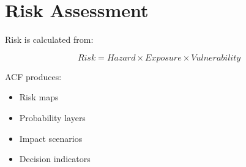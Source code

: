 \section{Risk Assessment}


Risk is calculated from:


\begin{equation}
Risk =
Hazard
\times
Exposure
\times
Vulnerability
\end{equation}



ACF produces:


\begin{itemize}

\item Risk maps

\item Probability layers

\item Impact scenarios

\item Decision indicators

\end{itemize}
